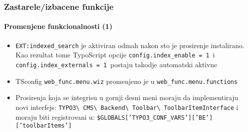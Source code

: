 \begin{frame}[fragile]
	\frametitle{Zastarele/izbacene funkcije}
	\framesubtitle{Promenjene funkcionalnosti (1)}

	\begin{itemize}

		\item \texttt{EXT:indexed\_search} je aktiviran odmah nakon sto je prosirenje instalirano.
			Kao rezultat tome TypoScript opcije \small\texttt{config.index\_enable = 1 }\normalsize i \small\texttt{config.index\_externals = 1 }\normalsize postaju takodje automatski aktivne
		
		\item TSconfig \small\texttt{web\_func.menu.wiz}\normalsize\space
			promenjeno je u \small\texttt{web\_func.menu.functions}\normalsize

		\item Prosirenja koja se integrisu u gornji desni meni moraju da implementiraju novi interfejs:
			\small
				\texttt{TYPO3\textbackslash
					CMS\textbackslash
					Backend\textbackslash
					Toolbar\textbackslash
					ToolbarItemInterface}
			\normalsize\newline
			i moraju biti registrovani u:
			\small
				\texttt{\$GLOBALS['TYPO3\_CONF\_VARS']['BE']['toolbarItems']}
			\normalsize

	\end{itemize}

\end{frame}


